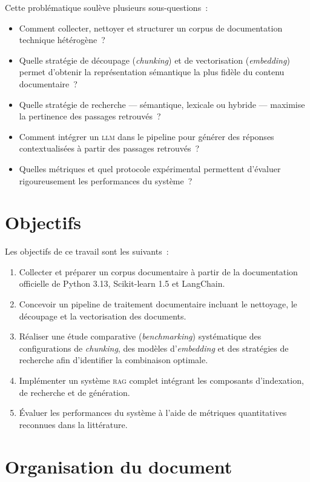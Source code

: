 \documentclass[12pt,a4paper,oneside]{report}
\newcommand{\rag}{\textsc{rag}}
\newcommand{\llm}{\textsc{llm}}
\begin{document}
Cette problématique soulève plusieurs sous-questions~:
\begin{itemize}[nosep]
  \item Comment collecter, nettoyer et structurer un corpus de documentation technique hétérogène~?
  \item Quelle stratégie de découpage (\textit{chunking}) et de vectorisation (\textit{embedding}) permet d'obtenir la représentation sémantique la plus fidèle du contenu documentaire~?
  \item Quelle stratégie de recherche --- sémantique, lexicale ou hybride --- maximise la pertinence des passages retrouvés~?
  \item Comment intégrer un \llm{} dans le pipeline pour générer des réponses contextualisées à partir des passages retrouvés~?
  \item Quelles métriques et quel protocole expérimental permettent d'évaluer rigoureusement les performances du système~?
\end{itemize}

\section{Objectifs}

Les objectifs de ce travail sont les suivants~:

\begin{enumerate}[nosep]
  \item Collecter et préparer un corpus documentaire à partir de la documentation officielle de Python 3.13, Scikit-learn 1.5 et LangChain.
  \item Concevoir un pipeline de traitement documentaire incluant le nettoyage, le découpage et la vectorisation des documents.
  \item Réaliser une étude comparative (\textit{benchmarking}) systématique des configurations de \textit{chunking}, des modèles d'\textit{embedding} et des stratégies de recherche afin d'identifier la combinaison optimale.
  \item Implémenter un système \rag{} complet intégrant les composants d'indexation, de recherche et de génération.
  \item Évaluer les performances du système à l'aide de métriques quantitatives reconnues dans la littérature.
\end{enumerate}

\section{Organisation du document}
\end{document}
